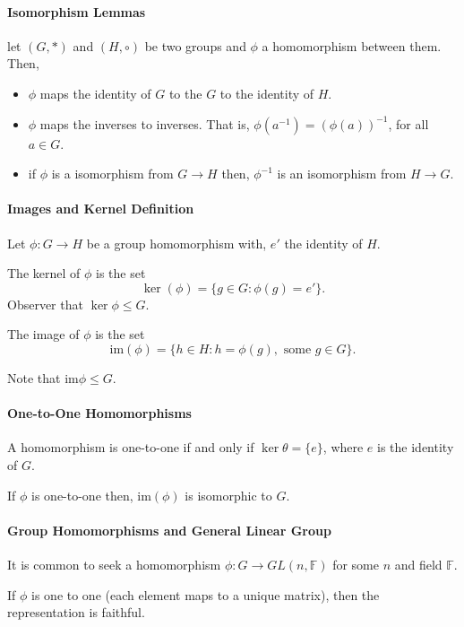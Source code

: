 \paragraph{Isomorphism Lemmas}
let \((G, *)\) and \((H, \circ)\) be two groups and \(\phi\) a homomorphism
between them.
Then,
\begin{itemize}
    \item \(\phi\) maps the identity of \(G\) to the \( G \) to the
    identity of \(H\).
    \item \(\phi\) maps the inverses to inverses. That is,
    \(\phi(a^{-1}) = (\phi(a))^{-1}\), for all \(a \in G\).
    \item if \(\phi\) is a isomorphism from \(G \to H\) then,
    \(\phi^{-1}\) is an isomorphism from \(H \to G\).
\end{itemize}

\paragraph{Images and Kernel Definition}
Let \(\phi: G\to H\) be a group homomorphism with, \(e'\) the identity
of \(H\).

The kernel of \(\phi\) is the set
\[
    \ker(\phi) = \{
        g\in G : \phi(g) = e'
    \}.
\]
Observer that \(\ker \phi \leq G\).

The image of \(\phi\) is the set \[
    \mathrm{im} (\phi) = \{
        h\in H : h = \phi(g), \text{ some } g\in G
    \}.
\]

Note that \(\mathrm{im}\phi \leq G\).

\paragraph{One-to-One Homomorphisms}
A homomorphism is one-to-one if and only if \(\ker \theta = \{e\}\),
where \(e\) is the identity of \(G\).

If \(\phi\) is one-to-one then, \(\textrm{im}(\phi)\) is isomorphic to
\(G\).

\paragraph{Group Homomorphisms and General Linear Group}
It is common to seek a homomorphism
\(\phi: G \to GL(n, \mathbb{F})\) for some \(n\) and field \(\mathbb{F}\).

If \(\phi\) is one to one (each element maps to a unique matrix), then
the representation is faithful.

